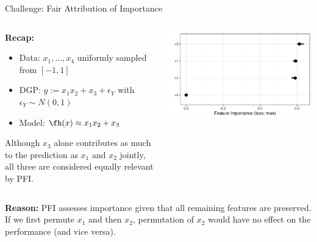 \documentclass[11pt,compress,t,notes=noshow, aspectratio=169, xcolor=table]{beamer}
\begin{document}
\begin{frame}{Challenge: Fair Attribution of Importance}
\begin{columns}[T]
\begin{column}{0.54\textwidth}
\textbf{Recap:} 
\begin{itemize}
\item Data: $x_1, \dots, x_4$ uniformly sampled from $[-1, 1]$ 
\item DGP: $y:= x_1 x_2 + x_3 + \epsilon_Y$ with $\epsilon_Y \sim N(0, 1)$
\item Model: $\fh(x) \approx x_1 x_2 + x_3$
\end{itemize}

\lz

Although $x_3$ alone contributes as much to the prediction as $x_1$ and $x_2$ jointly, all three are considered equally relevant by PFI.
\end{column}
\begin{column}{0.45\textwidth}
\centering
  \includegraphics[width=\linewidth]{figure_man/pfi_interactions.pdf}
\end{column}
\end{columns}
\lz
\textbf{Reason:} PFI assesses importance given that all remaining features are preserved. If we first permute $x_1$ and then $x_2$, permutation of $x_2$ would have no effect on the performance (and vice versa).
\end{frame}
\end{document}
